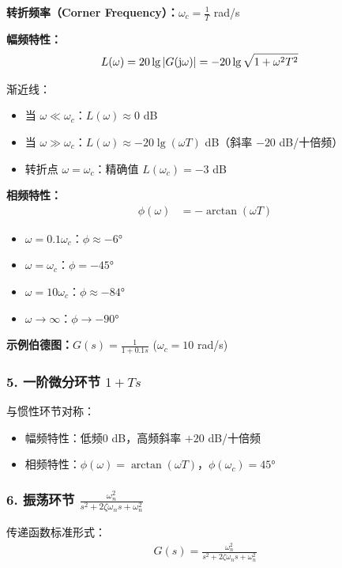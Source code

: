 \textbf{转折频率（Corner Frequency）：}$\omega_c = \frac{1}{T}$ rad/s

\textbf{幅频特性：}
\begin{align*}
L(\omega) &= 20\lg|G(\mathrm{j}\omega)| = -20\lg\sqrt{1 + \omega^2T^2}
\end{align*}

渐近线：
\begin{itemize}
    \item 当 $\omega \ll \omega_c$：$L(\omega) \approx 0$ dB
    \item 当 $\omega \gg \omega_c$：$L(\omega) \approx -20\lg(\omega T)$ dB（斜率 $-20$ dB/十倍频）
    \item 转折点 $\omega = \omega_c$：精确值 $L(\omega_c) = -3$ dB
\end{itemize}

\textbf{相频特性：}
\begin{align*}
\phi(\omega) &= -\arctan(\omega T)
\end{align*}
\begin{itemize}
    \item $\omega = 0.1\omega_c$：$\phi \approx -6°$
    \item $\omega = \omega_c$：$\phi = -45°$
    \item $\omega = 10\omega_c$：$\phi \approx -84°$
    \item $\omega \to \infty$：$\phi \to -90°$
\end{itemize}

\textbf{示例伯德图：}$G(s) = \frac{1}{1+0.1s}$ ($\omega_c = 10$ rad/s)
\begin{center}
\end{center}

\subsubsection{5. 一阶微分环节 $1+Ts$}
与惯性环节对称：
\begin{itemize}
    \item 幅频特性：低频0 dB，高频斜率 $+20$ dB/十倍频
    \item 相频特性：$\phi(\omega) = \arctan(\omega T)$，$\phi(\omega_c) = 45°$
\end{itemize}

\subsubsection{6. 振荡环节 $\frac{\omega_n^2}{s^2 + 2\zeta\omega_n s + \omega_n^2}$}
传递函数标准形式：
\begin{align*}
G(s) = \frac{\omega_n^2}{s^2 + 2\zeta\omega_n s + \omega_n^2}
\end{align*}

